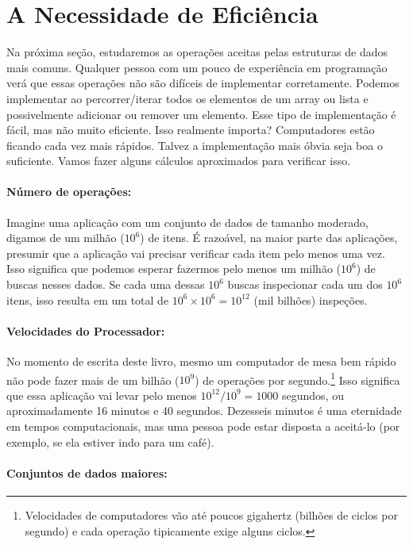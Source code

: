 \section{A Necessidade de Eficiência}
Na próxima seção, estudaremos as operações aceitas pelas estruturas de dados mais comuns.
Qualquer pessoa com um pouco de experiência em programação verá que essas operações não são difíceis de implementar corretamente.
Podemos implementar ao percorrer/iterar todos os elementos de um array ou lista e possivelmente adicionar ou remover um elemento.
Esse tipo de implementação é fácil, mas não muito eficiente.
Isso realmente importa? Computadores estão ficando cada vez mais rápidos.
Talvez a implementação mais óbvia seja boa o suficiente.
Vamos fazer alguns cálculos aproximados para verificar isso.

\paragraph{Número de operações:}
Imagine uma aplicação com um conjunto de dados de tamanho moderado, digamos de um milhão ($10^6$) de itens. 
É razoável, na maior parte das aplicações, presumir que a aplicação vai precisar verificar cada item pelo menos uma vez. Isso significa que podemos esperar fazermos pelo menos um milhão ($10^6$) de buscas nesses dados. Se cada uma dessas $10^6$ buscas inspecionar cada um dos $10^6$ itens, isso resulta em um total de $10^6\times 10^6=10^{12}$ (mil bilhões) inspeções.

\paragraph{Velocidades do Processador:} 

No momento de escrita deste livro, mesmo um computador de mesa bem rápido não pode fazer mais de um bilhão ($10^9$) de operações por segundo.\footnote{Velocidades de computadores vão até poucos gigahertz (bilhões de ciclos por segundo) e cada operação tipicamente exige alguns ciclos.}
Isso significa que essa aplicação vai levar pelo menos $10^{12}/10^9 = 1000$
segundos, ou aproximadamente 16 minutos e 40 segundos. Dezesseis minutos é uma eternidade em tempos computacionais, mas uma pessoa pode estar disposta a aceitá-lo (por exemplo, se ela estiver indo para um café).

\paragraph{Conjuntos de dados maiores:} 

